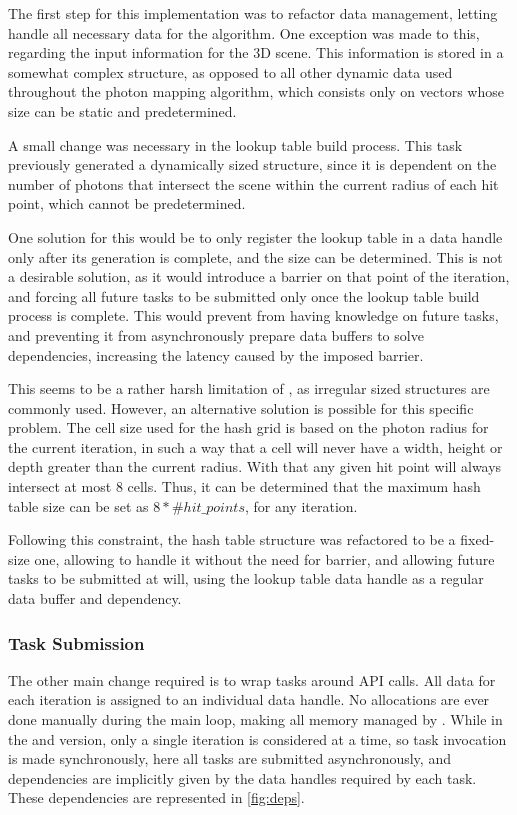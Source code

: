 \documentclass[main.tex]{subfiles}
\begin{document}
The first step for this implementation was to refactor data management, letting \starpu handle all necessary data for the algorithm. One exception was made to this, regarding the input information for the 3D scene. This information is stored in a somewhat complex structure, as opposed to all other dynamic data used throughout the photon mapping algorithm, which consists only on vectors whose size can be static and predetermined.

A small change was necessary in the lookup table build process. This task previously generated a dynamically sized structure, since it is dependent on the number of photons that intersect the scene within the current radius of each hit point, which cannot be predetermined.

One solution for this would be to only register the lookup table in a \starpu data handle only after its generation is complete, and the size can be determined. This is not a desirable solution, as it would introduce a barrier on that point of the iteration, and forcing all future tasks to be submitted only once the lookup table build process is complete. This would prevent \starpu from having knowledge on future tasks, and preventing it from asynchronously prepare data buffers to solve dependencies, increasing the latency caused by the imposed barrier.

This seems to be a rather harsh limitation of \starpu, as irregular sized structures are commonly used. However, an alternative solution is possible for this specific problem. The cell size used for the hash grid is based on the photon radius for the current iteration, in such a way that a cell will never have a width, height or depth greater than the current radius. With that any given hit point will always intersect at most 8 cells. Thus, it can be determined that the maximum hash table size can be set as $8 * \#hit\_points$, for any iteration.

Following this constraint, the hash table structure was refactored to be a fixed-size one, allowing \starpu to handle it without the need for barrier, and allowing future tasks to be submitted at will, using the lookup table data handle as a regular data buffer and dependency.

\subsubsection{Task Submission}

The other main change required is to wrap tasks around \starpu API calls. All data for each iteration is assigned to an individual data handle. No allocations are ever done manually during the main loop, making all memory managed by \starpu. While in the \cpu and \cuda version, only a single iteration is considered at a time, so task invocation is made synchronously, here all tasks are submitted asynchronously, and dependencies are implicitly given by the data handles required by each task. These dependencies are represented in \cref{fig:deps}.
\end{document}
